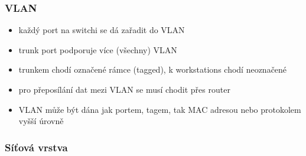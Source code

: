 \subsubsection*{VLAN}
\begin{itemize}
	\item každý port na switchi se dá zařadit do VLAN
	\item trunk port podporuje více (všechny) VLAN
	\item trunkem chodí označené rámce (tagged), k workstations chodí neoznačené
	\item pro přeposílání dat mezi VLAN se musí chodit přes router
	\item VLAN může být dána jak portem, tagem, tak MAC adresou nebo protokolem vyšší úrovně
\end{itemize}

\subsubsection*{Síťová vrstva}
